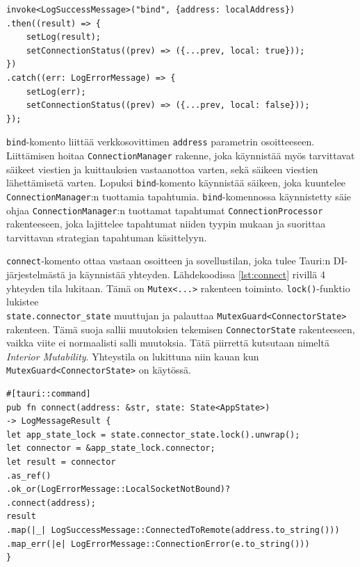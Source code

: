 \documentclass[a4paper,12pt]{article}
\begin{document}
    \begin{lstlisting}[caption={'bind'-komennon kutsuminen}, label={lst:calling_bind}]
invoke<LogSuccessMessage>("bind", {address: localAddress})
.then((result) => {
    setLog(result);
    setConnectionStatus((prev) => ({...prev, local: true}));
})
.catch((err: LogErrorMessage) => {
    setLog(err);
    setConnectionStatus((prev) => ({...prev, local: false}));
});\end{lstlisting}

    \lstinline{bind}-komento liittää verkkosovittimen \lstinline{address} parametrin osoitteeseen. Liittämisen hoitaa \lstinline{ConnectionManager} rakenne, joka käynnistää myös tarvittavat säikeet viestien ja kuittauksien vastaanottoa varten, sekä säikeen viestien lähettämisetä varten. Lopuksi \lstinline{bind}-komento käynnistää säikeen, joka kuuntelee\\ \lstinline{ConnectionManager}:n tuottamia tapahtumia.
    \lstinline{bind}-komennossa käynnistetty säie ohjaa \lstinline{ConnectionManager}:n tuottamat tapahtumat \lstinline{ConnectionProcessor} rakenteeseen, joka lajittelee tapahtumat niiden tyypin mukaan ja suorittaa tarvittavan strategian tapahtuman käsittelyyn.\par




    \lstinline{connect}-komento ottaa vastaan osoitteen ja sovellustilan, joka tulee Tauri:n DI-järjestelmästä ja käynnistää yhteyden. Lähdekoodissa \ref{lst:connect} rivillä 4 yhteyden tila lukitaan.
    Tämä on \lstinline{Mutex<...>} rakenteen toiminto. \lstinline{lock()}-funktio lukistee \\ \lstinline{state.connector_state} muuttujan ja palauttaa \lstinline{MutexGuard<ConnectorState>} rakenteen. Tämä suoja sallii muutoksien tekemisen \lstinline{ConnectorState} rakenteeseen, vaikka viite ei normaalisti salli muutoksia. Tätä piirrettä kutsutaan nimeltä \textit{Interior Mutability}. Yhteystila on lukittuna niin kauan kun \lstinline{MutexGuard<ConnectorState>} on käytössä.\par

    \begin{lstlisting}[basicstyle=\small\ttfamily,caption={'connect'-komento}, label={lst:connect}]
#[tauri::command]
pub fn connect(address: &str, state: State<AppState>)
-> LogMessageResult {
let app_state_lock = state.connector_state.lock().unwrap();
let connector = &app_state_lock.connector;
let result = connector
.as_ref()
.ok_or(LogErrorMessage::LocalSocketNotBound)?
.connect(address);
result
.map(|_| LogSuccessMessage::ConnectedToRemote(address.to_string()))
.map_err(|e| LogErrorMessage::ConnectionError(e.to_string()))
}\end{lstlisting}
\end{document}
